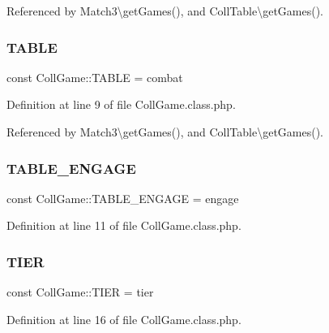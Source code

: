 Referenced by Match3\textbackslash{}get\+Games(), and Coll\+Table\textbackslash{}get\+Games().

\mbox{\label{class_coll_game_a62d305a47832d3165ad40d839c1b1e54}} 
\subsubsection{\texorpdfstring{T\+A\+B\+LE}{TABLE}}
{\footnotesize\ttfamily const Coll\+Game\+::\+T\+A\+B\+LE = \textquotesingle{}combat\textquotesingle{}}



Definition at line 9 of file Coll\+Game.\+class.\+php.



Referenced by Match3\textbackslash{}get\+Games(), and Coll\+Table\textbackslash{}get\+Games().

\mbox{\label{class_coll_game_a08f8c00b1a63643215180a53ab0578f2}} 
\subsubsection{\texorpdfstring{T\+A\+B\+L\+E\+\_\+\+E\+N\+G\+A\+GE}{TABLE\_ENGAGE}}
{\footnotesize\ttfamily const Coll\+Game\+::\+T\+A\+B\+L\+E\+\_\+\+E\+N\+G\+A\+GE = \textquotesingle{}engage\textquotesingle{}}



Definition at line 11 of file Coll\+Game.\+class.\+php.

\mbox{\label{class_coll_game_a8a76a1f6c7d1186c426c1139ba5818ab}} 
\subsubsection{\texorpdfstring{T\+I\+ER}{TIER}}
{\footnotesize\ttfamily const Coll\+Game\+::\+T\+I\+ER = \textquotesingle{}tier\textquotesingle{}}



Definition at line 16 of file Coll\+Game.\+class.\+php.



